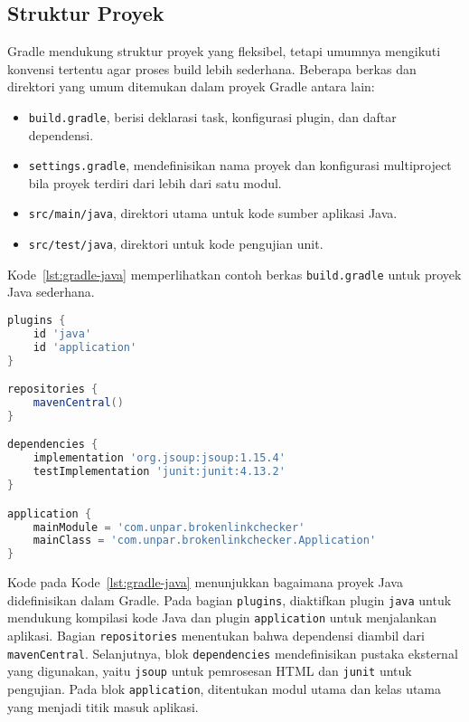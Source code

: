 \subsection{Struktur Proyek}
Gradle mendukung struktur proyek yang fleksibel, tetapi umumnya mengikuti konvensi tertentu agar proses build lebih sederhana. Beberapa berkas dan direktori yang umum ditemukan dalam proyek Gradle antara lain:  

\begin{itemize}
    \item \texttt{build.gradle}, berisi deklarasi task, konfigurasi plugin, dan daftar dependensi.
    \item \texttt{settings.gradle}, mendefinisikan nama proyek dan konfigurasi multiproject bila proyek terdiri dari lebih dari satu modul.
    \item \texttt{src/main/java}, direktori utama untuk kode sumber aplikasi Java.
    \item \texttt{src/test/java}, direktori untuk kode pengujian unit.
\end{itemize}

Kode~\ref{lst:gradle-java} memperlihatkan contoh berkas \texttt{build.gradle} untuk proyek Java sederhana.

\begin{lstlisting}[language=groovy, caption=Contoh berkas build.gradle untuk proyek Java, label=lst:gradle-java]
plugins {
    id 'java'
    id 'application'
}

repositories {
    mavenCentral()
}

dependencies {
    implementation 'org.jsoup:jsoup:1.15.4'
    testImplementation 'junit:junit:4.13.2'
}

application {
    mainModule = 'com.unpar.brokenlinkchecker'
    mainClass = 'com.unpar.brokenlinkchecker.Application'
}
\end{lstlisting}

Kode pada Kode~\ref{lst:gradle-java} menunjukkan bagaimana proyek Java didefinisikan dalam Gradle. Pada bagian \texttt{plugins}, diaktifkan plugin \texttt{java} untuk mendukung kompilasi kode Java dan plugin \texttt{application} untuk menjalankan aplikasi. Bagian \texttt{repositories} menentukan bahwa dependensi diambil dari \texttt{mavenCentral}. Selanjutnya, blok \texttt{dependencies} mendefinisikan pustaka eksternal yang digunakan, yaitu \texttt{jsoup} untuk pemrosesan HTML dan \texttt{junit} untuk pengujian. Pada blok \texttt{application}, ditentukan modul utama dan kelas utama yang menjadi titik masuk aplikasi.


